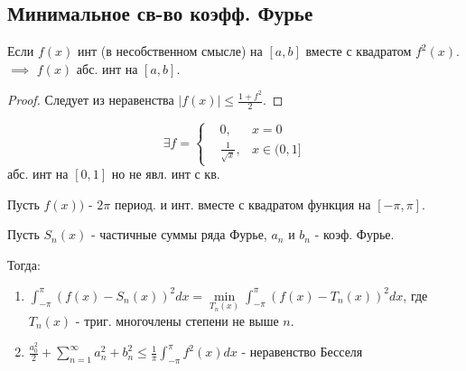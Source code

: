 \documentclass{article}
\begin{document}
\subsection{Минимальное св-во коэфф. Фурье}
\begin{lemma}
  Если $f(x)$ инт (в несобственном смысле) на $[a,b]$ вместе с квадратом $f^{2}(x)$.
  $\implies$ $f(x)$ абс. инт на $[a,b]$.
\end{lemma}
\begin{proof}
  Следует из неравенства $|f(x)|\le \frac{1+f^{2}}{2}$.
\end{proof}
\begin{remark}
  \[
    \exists f=\left\{\begin{aligned}
      &0, & x=0 \\ 
      &\frac{1}{\sqrt{x}}, & x\in (0, 1]
    \end{aligned}\right.
  \]
  абс. инт на $[0,1]$ но не явл. инт с кв.
\end{remark}
\begin{theorem}
  Пусть $f(x))$ - $2\pi$ период. и инт. вместе с квадратом функция на $[-\pi,\pi]$.

  Пусть $S_n(x)$ - частичные суммы ряда Фурье, $a_n$ и $b_n$ - коэф. Фурье.

  Тогда:
  \begin{enumerate}
    \item $\int_{-\pi}^{\pi}(f(x)-S_n(x))^{2}dx=\min\limits_{T_n(x)}\int_{-\pi}^{\pi}(f(x)-T_n(x))^{2}dx$,
      где $T_n(x)$ - триг. многочлены степени не выше $n$.
    \item $\frac{a_0^{2}}{2}+\sum_{n=1}^{\infty}a^{2}_n+b^{2}_{n}\le \frac{1}{\pi}\int_{-\pi}^{\pi}f^{2}(x)dx$
- неравенство Бесселя
  \end{enumerate}
\end{theorem}
\end{document}
